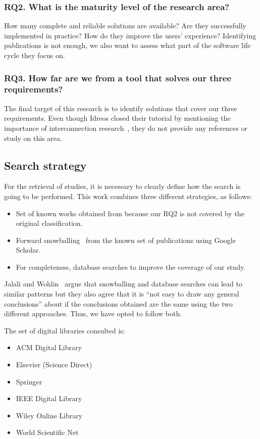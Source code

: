 \subsubsection{RQ2. What is the maturity level of the research area?}
How many complete and reliable solutions are available?
Are they successfully implemented in practice?
How do they improve the users' experience? Identifying publications is not enough,
we also want to assess what part of the software life cycle they focus on.

\subsubsection{RQ3. How far are we from a tool that solves our three requirements?}
The final target of this research is to identify solutions that cover our three
requirements.
Even though Idreos closed their tutorial by
mentioning the importance of interconnection research~\cite{Idreos2015}, they do not provide any references or study on this area.

\subsection{Search strategy}
\label{sec:mapping/search_strategy}

For the retrieval of studies, it is necessary to clearly define
how the search is going to be performed. This work combines
three different strategies, as follows:

\begin{itemize}
  \item Set of known works obtained from \cite{Idreos2015} because our RQ2 is
    not covered by the original classification.
  \item Forward snowballing~\cite{Webster2002} from the known set of publications using Google Scholar.
  \item For completeness, database searches to improve the coverage of our study.
\end{itemize}

Jalali and Wohlin~\cite{Jalali2012} argue that snowballing and database searches
can lead to similar patterns but they also agree that it is
``not easy to draw any general conclusions'' about if the conclusions obtained are the same
using the two different approaches. Thus, we have opted to follow both.

The set of digital libraries consulted is:

\begin{itemize}
  \item ACM Digital Library
  \item Elsevier (Science Direct)
  \item Springer
  \item IEEE Digital Library
  \item Wiley Online Library
  \item World Scientific Net
\end{itemize}

